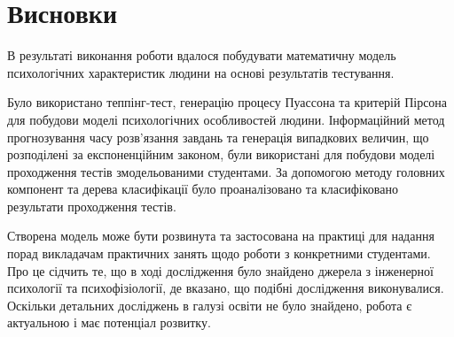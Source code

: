 \chapter*{Висновки}

В результаті виконання роботи вдалося побудувати математичну модель
психологічних характеристик людини на основі результатів тестування.

Було використано теппінг-тест, генерацію процесу Пуассона та критерій Пірсона
для побудови моделі психологічних особливостей людини.
Інформаційний метод прогнозування часу розв’язання завдань та генерація
випадкових величин, що розподілені за експоненційним законом, були використані
для побудови моделі проходження тестів змодельованими студентами.
За допомогою методу головних компонент та дерева класифікації було
проаналізовано та класифіковано результати проходження тестів.

Створена модель може бути розвинута та застосована на практиці для надання порад
викладачам практичних занять щодо роботи з конкретними студентами.
Про це сідчить те, що в ході дослідження було знайдено джерела з інженерної
психології та психофізіології, де вказано, що подібні дослідження виконувалися.
Оскільки детальних досліджень в галузі освіти не було знайдено, робота є
актуальною і має потенціал розвитку.
